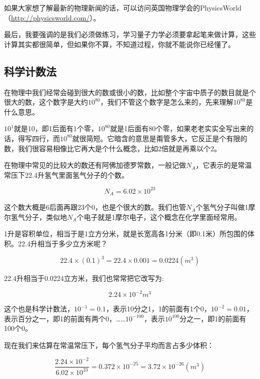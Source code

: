 如果大家想了解最新的物理新闻的话，可以访问英国物理学会的PhysicsWorld（\url{http://physicsworld.com/}）。

最后，我要强调的是我们必须做练习，学习量子力学必须要拿起笔来做计算，这些计算其实都很简单，但如果你不算，不知道过程，你就不能说你已经懂了。


\subsection{科学计数法}

在物理中我们经常会碰到很大的数或很小的数，比如整个宇宙中质子的数目就是个很大的数，这个数字是大约$10^{80}$，我们不管这个数字是怎么来的，先来理解$10^{80}$是什么意思。

$10^1$就是10，即1后面有1个零，$10^{80}$就是1后面有80个零，如果老老实实全写出来的话，得写四行，而$10^{80}$就很简短。它暗含的意思是甭管多大，它反正是个有限的数，我们很容易相像比它再大是个什么概念，比如2倍就是再乘以个2。

在物理中常见的比较大的数还有阿佛加德罗常数，一般记做$N_A$，它表示的是常温常压下22.4升氢气里面氢气分子的个数。

\begin{equation}
N_A = 6.02 \times 10^{23}
\end{equation}

这个数大概是6后面再跟23个0，也是个很大的数。我们也管$N_A$个氢气分子叫做1摩尔氢气分子，类似地$N_A$个电子就是1摩尔电子，这个概念在化学里面经常用。

1升是容积单位，相当于是1立方分米，就是长宽高各1分米（即0.1米）所包围的体积。22.4升相当于多少立方米呢？

\begin{equation*}
22.4 \times (0.1)^3 = 22.4 \times 0.001 = 0.0224 (m^3)
\end{equation*}

22.4升相当于0.0224立方米，我们也常常把它改写为:

\begin{equation*}
2.24 \times 10^{-2} m^3
\end{equation*}

这个也是科学计数法，$10^{-1} = 0.1$，表示10分之1，1的前面有1个0，$10^{-2} = 0.01$，表示百分之一，即1的前面有两个0，……$10^{-100}$，表示$10^{100}$分之一，即1的前面有100个0。

现在我们来估算在常温常压下，每个氢气分子平均而言占多少体积：

\begin{equation*}
\frac{2.24 \times 10^{-2}}{6.02 \times 10^{23}} = 0.372 \times 10^{-25} = 3.72 \times 10^{-26} (m^3)
\end{equation*}

